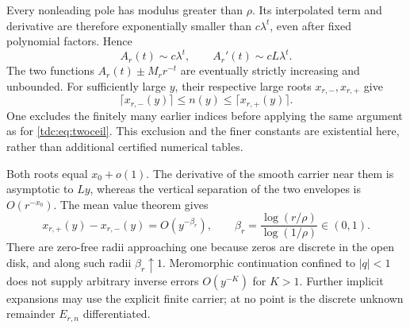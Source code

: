 \documentclass[11pt]{article}
\theoremstyle{definition}\newtheorem{definition}[theorem]{Definition}
\theoremstyle{remark}\newtheorem{remark}[theorem]{Remark}
\begin{document}
Every nonleading pole has modulus greater than $\rho$. Its interpolated term and derivative are therefore exponentially smaller than $c\lambda^t$, even after fixed polynomial factors. Hence
\[
 A_r(t)\sim c\lambda^t,\qquad A_r'(t)\sim cL\lambda^t.
\]
The two functions $A_r(t)\pm M_r r^{-t}$ are eventually strictly increasing and unbounded. For sufficiently large $y$, their respective large roots $x_{r,-},x_{r,+}$ give
\begin{equation}\label{tdc:eq:spectralinverse}
 \lceil x_{r,-}(y)\rceil\le n(y)\le\lceil x_{r,+}(y)\rceil.
\end{equation}
One excludes the finitely many earlier indices before applying the same argument as for \eqref{tdc:eq:twoceil}. This exclusion and the finer constants are existential here, rather than additional certified numerical tables.

Both roots equal $x_0+o(1)$. The derivative of the smooth carrier near them is asymptotic to $Ly$, whereas the vertical separation of the two envelopes is $O(r^{-x_0})$. The mean value theorem gives
\begin{equation}\label{tdc:eq:betar}
 x_{r,+}(y)-x_{r,-}(y)=O(y^{-\beta_r}),\qquad
 \beta_r=\frac{\log(r/\rho)}{\log(1/\rho)}\in(0,1).
\end{equation}
There are zero-free radii approaching one because zeros are discrete in the open disk, and along such radii $\beta_r\uparrow1$. Meromorphic continuation confined to $|q|<1$ does not supply arbitrary inverse errors $O(y^{-K})$ for $K>1$. Further implicit expansions may use the explicit finite carrier; at no point is the discrete unknown remainder $E_{r,n}$ differentiated.
\end{document}
